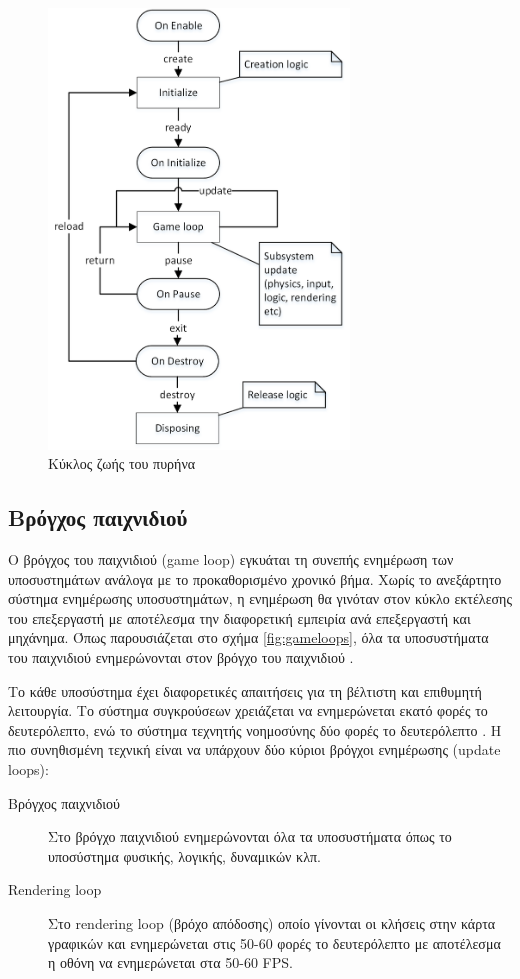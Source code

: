	\begin{figure}[h!]
		\centering
		\includegraphics[width=80mm]{Images/core_lifecycle}
		\caption{Κύκλος ζωής του πυρήνα}
		\label{fig:corelifecycle}
	\end{figure}
		
	\subsection{Βρόγχος παιχνιδιού}
	Ο βρόγχος του παιχνιδιού (game loop) εγκυάται τη συνεπής ενημέρωση των υποσυστημάτων ανάλογα με το προκαθορισμένο χρονικό βήμα. Χωρίς το ανεξάρτητο σύστημα ενημέρωσης υποσυστημάτων, η ενημέρωση θα γινόταν στον κύκλο εκτέλεσης του επεξεργαστή με αποτέλεσμα την διαφορετική εμπειρία ανά επεξεργαστή και μηχάνημα. Όπως παρουσιάζεται στο σχήμα \ref{fig:gameloops}, όλα τα υποσυστήματα του παιχνιδιού ενημερώνονται στον βρόγχο του παιχνιδιού  .
	
	Το κάθε υποσύστημα έχει διαφορετικές απαιτήσεις για τη βέλτιστη και επιθυμητή λειτουργία. Το σύστημα συγκρούσεων χρειάζεται να ενημερώνεται εκατό φορές το δευτερόλεπτο, ενώ το σύστημα τεχνητής νοημοσύνης δύο φορές το δευτερόλεπτο \cite{gregory2009game}. Η πιο συνηθισμένη τεχνική είναι να υπάρχουν δύο κύριοι βρόγχοι ενημέρωσης (update loops):
	\begin{description}
	\item [Βρόγχος παιχνιδιού] Στο βρόγχο παιχνιδιού ενημερώνονται όλα τα υποσυστήματα όπως το υποσύστημα φυσικής, λογικής, δυναμικών κλπ.
	\item [Rendering loop] Στο rendering loop (βρόχο απόδοσης) οποίο γίνονται οι κλήσεις στην κάρτα γραφικών και ενημερώνεται στις 50-60 φορές το δευτερόλεπτο με αποτέλεσμα η οθόνη να ενημερώνεται στα 50-60 \gls{FPS}.
	\end{description}
	
